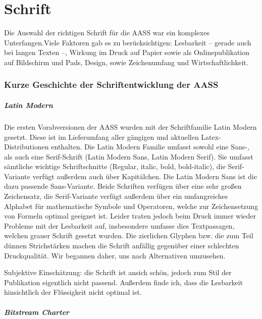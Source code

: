 \documentclass[
ngerman,
paper=a4,
asymmetric,
fontsize=10pt,
draft=false,
numbers=noenddot,
bibtotocnumbered,
footnotes=multiple,
toc=flat,
]{scrbook}
\begin{document}
\section{Schrift}

Die Auswahl der richtigen Schrift für die AASS  war ein
komplexes Unterfangen.Viele Faktoren gab es zu
berücksichtigen: Lesbarkeit – gerade auch bei langen Texten
–, Wirkung im Druck auf Papier sowie als Onlinepublikation
auf Bildschirm und Pads, Design, sowie Zeichenumfang und
Wirtschaftlichkeit.

\subsubsection{Kurze Geschichte der Schriftentwicklung der
AASS}

{\setmainfont{Latin Modern Roman}\setsansfont{Latin Modern Sans}
\subparagraph{Latin Modern}
Die ersten Vorabversionen der AASS wurden mit der
Schriftfamilie Latin Modern gesetzt. Diese ist im
Lieferumfang aller gängigen und aktuellen
Latex-Distributionen enthalten. Die Latin Modern Familie
umfasst sowohl eine Sans-, als auch eine Serif-Schrift
(Latin Modern Sans, Latin Modern Serif). Sie umfasst
sämtliche wichtige Schriftschnitte (Regular, italic, bold,
bold-italic), die Serif-Variante verfügt außerdem auch über
Kapitälchen. Die Latin
{\sffamily Modern Sans ist die dazu passende Sans-Variante.}
Beide Schriften verfügen über eine sehr großen Zeichensatz, die Serif-Variante verfügt außerdem über
ein umfangreiches Alphabet für mathematische Symbole und
Operatoren, welche zur Zeichensetzung von Formeln optimal
geeignet ist. Leider traten jedoch beim Druck immer wieder
Probleme mit der Lesbarkeit auf, insbesondere umfasse dies
Textpassagen, welchen grauer Schrift gesetzt wurden. Die
zierlichen Glyphen bzw. die zum Teil dünnen Strichstärken
machen die Schrift anfällig gegenüber einer schlechten
Druckqualität. Wir begannen daher, uns nach Alternativen
umzusehen.


Subjektive Einschätzung: die Schrift ist ansich schön,
jedoch zum Stil der Publikation eigentlich nicht passend.
Außerdem finde ich, dass die Lesbarkeit hinsichtlich der
Flüssigkeit nicht optimal ist.}


\subparagraph{Bitstream Charter}
\end{document}

